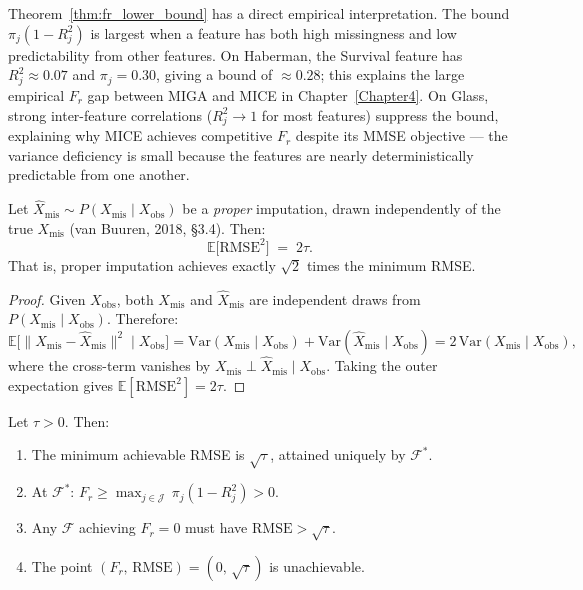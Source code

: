 \begin{remark}
Theorem~\ref{thm:fr_lower_bound} has a direct empirical interpretation. The bound $\pi_j(1-R_j^2)$ is largest when a feature has both high missingness and low predictability from other features. On Haberman, the Survival feature has $R_j^2 \approx 0.07$ and $\pi_j = 0.30$, giving a bound of $\approx 0.28$; this explains the large empirical $F_r$ gap between MIGA and MICE in Chapter~\ref{Chapter4}. On Glass, strong inter-feature correlations ($R_j^2 \to 1$ for most features) suppress the bound, explaining why MICE achieves competitive $F_r$ despite its MMSE objective --- the variance deficiency is small because the features are nearly deterministically predictable from one another.
\end{remark}

\begin{proposition}
\label{prop:proper_rmse}
Let $\hat{X}_{\mathrm{mis}} \sim P(X_{\mathrm{mis}} \mid X_{\mathrm{obs}})$ be a \emph{proper} imputation, drawn independently of the true $X_{\mathrm{mis}}$ (van Buuren, 2018, \S3.4). Then:
\begin{equation}
    \mathbb{E}\!\bigl[\mathrm{RMSE}^2\bigr] \;=\; 2\tau.
    \label{eq:proper_rmse}
\end{equation}
That is, proper imputation achieves exactly $\sqrt{2}$ times the minimum RMSE.
\end{proposition}

\begin{proof}
Given $X_{\mathrm{obs}}$, both $X_{\mathrm{mis}}$ and $\hat{X}_{\mathrm{mis}}$ are independent draws from $P(X_{\mathrm{mis}} \mid X_{\mathrm{obs}})$. Therefore:
\[
    \mathbb{E}\!\bigl[\|X_{\mathrm{mis}} - \hat{X}_{\mathrm{mis}}\|^2 \mid X_{\mathrm{obs}}\bigr]
    = \mathrm{Var}(X_{\mathrm{mis}} \mid X_{\mathrm{obs}}) + \mathrm{Var}(\hat{X}_{\mathrm{mis}} \mid X_{\mathrm{obs}})
    = 2\,\mathrm{Var}(X_{\mathrm{mis}} \mid X_{\mathrm{obs}}),
\]
where the cross-term vanishes by $X_{\mathrm{mis}} \perp \hat{X}_{\mathrm{mis}} \mid X_{\mathrm{obs}}$.
Taking the outer expectation gives $\mathbb{E}[\mathrm{RMSE}^2] = 2\tau$.
\end{proof}

\begin{theorem}
\label{thm:tradeoff_bound}
Let $\tau > 0$. Then:
\begin{enumerate}
    \item[(i)] The minimum achievable RMSE is $\sqrt{\tau}$, attained uniquely by $\mathcal{F}^*$.
    \item[(ii)] At $\mathcal{F}^*$: $F_r \geq \max_{j \in \mathcal{J}}\,\pi_j(1 - R_j^2) > 0$.
    \item[(iii)] Any $\mathcal{F}$ achieving $F_r = 0$ must have $\mathrm{RMSE} > \sqrt{\tau}$.
    \item[(iv)] The point $(F_r,\,\mathrm{RMSE}) = (0,\,\sqrt{\tau})$ is unachievable.
\end{enumerate}
\end{theorem}

